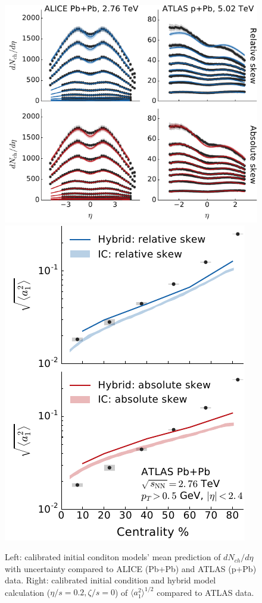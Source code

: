 \documentclass[3p,times,twocolumn]{elsarticle}
\begin{document}
\begin{center}
\begin{figure}
\includegraphics[scale=0.85]{chg_particle_rapidity.pdf}
\hfill
\includegraphics[scale=0.85]{fw_correlation_a1.pdf}
\caption{
	\label{fig:calibrate}
	Left: calibrated initial conditon models' mean prediction of $dN_{ch}/d\eta$ with uncertainty compared to ALICE (Pb+Pb) and ATLAS (p+Pb) data. Right: calibrated initial condition and hybrid model calculation ($\eta/s=0.2, \zeta/s=0$) of $\langle a_1^2\rangle^{1/2}$ compared to ATLAS data.
	}
\end{figure}
\end{center}
\end{document}

